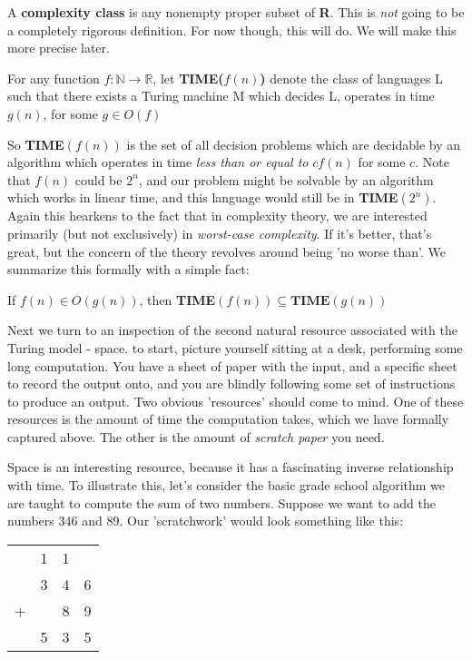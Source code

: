 A \textbf{complexity class} is any nonempty proper subset of \textbf{R}. This is \textit{not} going to be a completely rigorous definition. For now though, this will do. We will make this more precise later.
\begin{definition}
	 For any function $f:\mathbb{N} \to \mathbb{R}$, let \textbf{TIME($f(n)$)} denote the class of languages L such that there exists a Turing machine M which decides L, operates in time $g(n)$, for some $g \in O(f)$
\end{definition}
So \textbf{TIME}$(f(n))$ is the set of all decision problems which are decidable by an algorithm which operates in time \textit{less than or equal to} $cf(n)$ for some $c$. Note that $f(n)$ could be $2^n$, and our problem might be solvable by an algorithm which works in linear time, and this language would still be in \textbf{TIME}$(2^n)$. Again this hearkens to the fact that in complexity theory, we are interested primarily (but not exclusively) in \textit{worst-case complexity}. If it's better, that's great, but the concern of the theory revolves around being 'no worse than'. We summarize this formally with a simple fact:
\begin{fact}
	If $f(n) \in O(g(n))$, then \textbf{TIME}$(f(n)) \subseteq \textbf{TIME}(g(n))$ 
\end{fact}
Next we turn to an inspection of the second natural resource associated with the Turing model - space. to start, picture yourself sitting at a desk, performing some long computation. You have a sheet of paper with the input, and a specific sheet to record the output onto, and you are blindly following some set of instructions to produce an output. Two obvious 'resources' should come to mind. One of these resources is the amount of time the computation takes, which we have formally captured above. The other is the amount of \textit{scratch paper} you need. 

Space is an interesting resource, because it has a fascinating inverse relationship with time. To illustrate this, let's consider the basic grade school algorithm we are taught to compute the sum of two numbers. Suppose we want to add the numbers 346 and 89. Our 'scratchwork' would look something like this:
\begin{center}
\begin{tabular}{c@{\,}c@{\,}c@{\,}c}
  & 1 & 1 &   \\
  & 3 & 4 & 6 \\
+ &   & 8 & 9 \\ 
\hline
  & 5 & 3 & 5 \\
\end{tabular}
\end{center}

